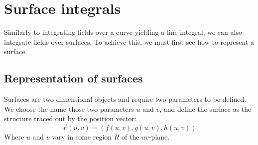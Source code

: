 \documentclass[11pt]{article}
\begin{document}
        \section{Surface integrals}\label{sec:surface-integrals}
            Similarly to integrating fields over a curve yielding a line integral, we can also integrate fields over surfaces.
            To achieve this, we must first see how to represent a surface.
            \subsection{Representation of surfaces}\label{subsec:representation-of-surfaces}
                Surfaces are two-dimensional objects and require two parameters to be defined.
                We choose the name those two parameters $u$ and $v$, and define the surface as the structure traced out by the position vector:
                \begin{equation}
                    \label{eq:equation5}
                    \vec{r}(u,v) = (f(u,v), g(u,v), h(u,v))
                \end{equation}
                Where $u$ and $v$ vary in some region $R$ of the $uv$-plane.
\end{document}
